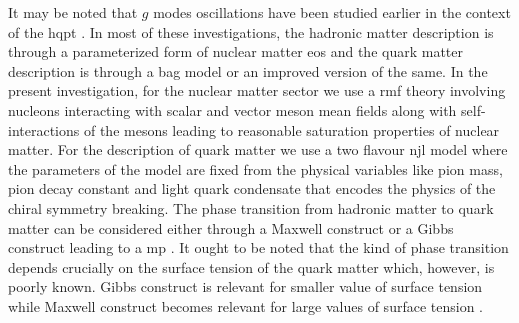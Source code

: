 \documentclass[a4paper, 11pt]{article}
\begin{document}
It may be noted that $g$ modes oscillations have been studied earlier in the context of the \ac{hqpt} 
\cite{Sotani:2010, Brillante:2014, Flores:2013, Wei:2018, Sandoval:2018, Lau:2020, Rodriguez:2020, Jaikumar:2021jbw,
 Constantinou:2021hba}. In most of these investigations, the hadronic matter description is through a parameterized 
form of nuclear matter \ac{eos} and the quark matter description is through a bag model or an improved version of the same.
 In the present investigation, for the nuclear matter sector we use a \ac{rmf} theory involving nucleons interacting
 with scalar and vector meson mean fields along with self-interactions of the mesons leading to reasonable saturation 
properties of nuclear matter. For the description of quark matter we use  a 
two flavour \ac{njl} model where the parameters of the model are fixed from the physical variables like pion mass, pion decay constant and light quark condensate that encodes the physics of the chiral symmetry breaking. The phase transition from hadronic matter to quark matter can be considered either through a Maxwell construct or a Gibbs construct leading to a \ac{mp} \cite{Glendenning:1992}. It ought to be noted that the kind of phase transition depends crucially on the surface tension \cite{Alford:2001, Voskresensky:2002, Palhares:2010, Pinto:2012, Mintz:2012, Lugones:2013, Yasutake:2014} of the quark matter which, however, is poorly known. Gibbs construct is relevant for smaller value of surface tension while Maxwell construct becomes relevant for large values of surface tension \cite{Voskresensky:2001, Maruyama:2007}.
\end{document}
